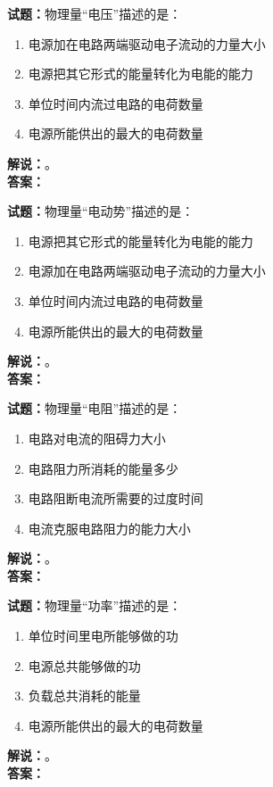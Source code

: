 \documentclass{ctexbook}
\begin{document}
\vspace{\baselineskip}

\noindent\textbf{试题：}物理量“电压”描述的是：
\begin{enumerate}[leftmargin=3em]
  \item 电源加在电路两端驱动电子流动的力量大小
  \item 电源把其它形式的能量转化为电能的能力
  \item 单位时间内流过电路的电荷数量
  \item 电源所能供出的最大的电荷数量
\end{enumerate}
\noindent\textbf{解说：}\textbf{}。\\\noindent\textbf{答案：}

\vspace{\baselineskip}

\noindent\textbf{试题：}物理量“电动势”描述的是：
\begin{enumerate}[leftmargin=3em]
  \item 电源把其它形式的能量转化为电能的能力
  \item 电源加在电路两端驱动电子流动的力量大小
  \item 单位时间内流过电路的电荷数量
  \item 电源所能供出的最大的电荷数量
\end{enumerate}
\noindent\textbf{解说：}\textbf{}。\\\noindent\textbf{答案：}

\vspace{\baselineskip}

\noindent\textbf{试题：}物理量“电阻”描述的是：
\begin{enumerate}[leftmargin=3em]
  \item 电路对电流的阻碍力大小
  \item 电路阻力所消耗的能量多少
  \item 电路阻断电流所需要的过度时间
  \item 电流克服电路阻力的能力大小
\end{enumerate}
\noindent\textbf{解说：}\textbf{}。\\\noindent\textbf{答案：}

\vspace{\baselineskip}

\noindent\textbf{试题：}物理量“功率”描述的是：
\begin{enumerate}[leftmargin=3em]
  \item 单位时间里电所能够做的功
  \item 电源总共能够做的功
  \item 负载总共消耗的能量
  \item 电源所能供出的最大的电荷数量
\end{enumerate}
\noindent\textbf{解说：}\textbf{}。\\\noindent\textbf{答案：}
\end{document}
